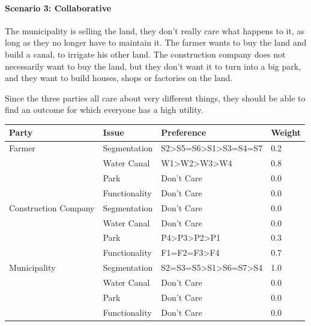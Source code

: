 \documentclass[a4,11pt]{scrartcl}
\begin{document}
    \paragraph{Scenario 3: Collaborative}
    
    The municipality is selling the land, they don't really care what 
    happens to it, as long as they no longer have to maintain it. The 
    farmer wants to buy the land and build a canal, to irrigate his 
    other land. The construction company does not necessarily want to 
    buy the land, but they don't want it to turn into a big park, and 
    they want to build houses, shops or factories on the land.
    
    Since the three parties all care about very different things, they
    should be able to find an outcome for which everyone has a high
    utility.
    
    \begin{center}
    \begin{tabular}{|l|l|l|l|}
        \hline{}
        {\bf Party}&{\bf Issue}&{\bf Preference}&{\bf Weight}\\
        \hline\hline
        Farmer & Segmentation & S2\textgreater S5=S6\textgreater S1\textgreater S3=S4=S7 & 0.2\\
        \cline{2-4}&Water Canal & W1\textgreater W2\textgreater W3\textgreater W4 &0.8\\
        \cline{2-4}&Park& Don't Care & 0.0\\
        \cline{2-4}&Functionality& Don't Care & 0.0\\
        \hline\hline{}
        Construction Company & Segmentation & Don't Care & 0.0\\
        \cline{2-4}&Water Canal & Don't Care &0.0\\
        \cline{2-4}&Park& P4\textgreater P3\textgreater P2\textgreater P1 & 0.3\\
        \cline{2-4}&Functionality& F1=F2=F3\textgreater F4 & 0.7\\
        \hline\hline{}
        Municipality & Segmentation & S2=S3=S5\textgreater S1\textgreater S6=S7\textgreater S4 & 1.0\\
        \cline{2-4}&Water Canal & Don't Care &0.0\\
        \cline{2-4}&Park& Don't Care & 0.0\\
        \cline{2-4}&Functionality& Don't Care & 0.0\\
        \hline
    \end{tabular}
    \end{center}
    
\end{document}
